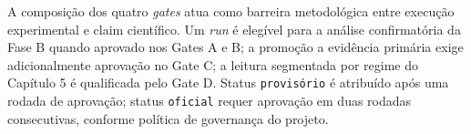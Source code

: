 A composição dos quatro \textit{gates} atua como barreira metodológica entre execução experimental e claim científico. Um \textit{run} é elegível para a análise confirmatória da Fase B quando aprovado nos Gates A e B; a promoção a evidência primária exige adicionalmente aprovação no Gate C; a leitura segmentada por regime do Capítulo 5 é qualificada pelo Gate D. Status \texttt{provisório} é atribuído após uma rodada de aprovação; status \texttt{oficial} requer aprovação em duas rodadas consecutivas, conforme política de governança do projeto.

